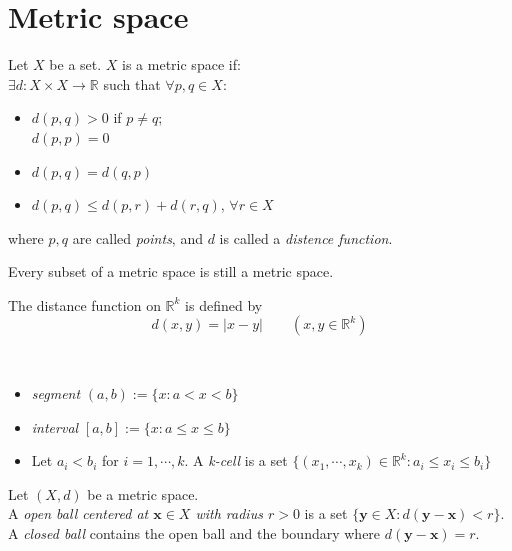 \section{Metric space}
\begin{definition} Let $X$ be a set. $X$ is a metric space if:
    \\$\exists d:X\times X \to \mathbb{R}$ such that $\forall p,q \in X$:
    \begin{itemize}
        \item $d(p,q)>0$ if $p\neq q$; \\$d(p,p) = 0$
        \item $d(p,q) = d(q,p)$
        \item $d(p,q)\le d(p,r)+d(r,q)$, $\forall r \in X$
    \end{itemize}
    where $p,q$ are called \textit{points}, and $d$ is called a \textit{distence function}.
\end{definition}

\begin{remark}
Every subset of a metric space is still a metric space.
\end{remark}

\begin{eg}    
The distance function on $\mathbb{R}^{k}$ is defined by
$$
d(x,y) = |x-y| \qquad (x,y \in \mathbb{R}^{k})
$$
\end{eg}

\begin{definition}~
\begin{itemize}
    \item \textit{segment}  $(a,b) := \{ x : a<x<b\}$
    \item \textit{interval}  $[a,b] := \{ x : a\le x\le b\}$
    \item Let $a_i < b_i$ for $i=1,\cdots ,k$. A \textit{k-cell}  is a set $\{ (x_1,\cdots ,x_k) \in \mathbb{R}^{k}: a_i\le x_i\le b_i\}$
\end{itemize}
\end{definition}

\begin{definition}[Ball] Let $(X,d)$ be a metric space.
    \\A \textit{open ball centered at $\mathbf{x} \in X$ with radius $r > 0$} is a set $\{ \mathbf{y} \in X : d(\mathbf{y}-\mathbf{x})<r \}$. A \textit{closed ball} contains the open ball and the boundary where $d(\mathbf{y}-\mathbf{x}) = r$.
\end{definition}

